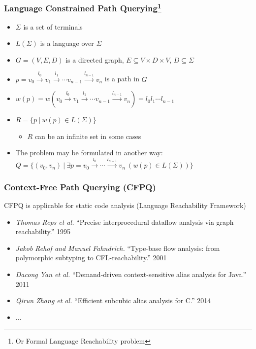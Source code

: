 \documentclass[xcolor=table]{beamer}
\begin{document}
\begin{frame}[fragile]
  \frametitle{Language Constrained Path Querying\footnote{Or Formal Language Reachability problem}}
  \begin{itemize}
  \item $\Sigma$ is a set of terminals 
  \item $L(\Sigma)$ is a language over $\Sigma$
  \pause
  \item $G = (V,E,D)$ is a directed graph, $E \subseteq V\times D \times V$, $D\subseteq \Sigma$
  \pause
  \item $p = v_0 \xrightarrow{l_0} v_1 \xrightarrow{l_1} \cdots v_{n-1}\xrightarrow{l_{n-1}}v_n$ is a path in $G$
  \item $w(p) = w(v_0 \xrightarrow{l_0} v_1 \xrightarrow{l_1} \cdots v_{n-1}\xrightarrow{l_{n-1}}v_n) = l_0 l_1 \cdots l_{n-1}$
  \pause
  \item $R =\{ p \ | \ w(p) \in L(\Sigma)\}$
  \begin{itemize}
    \item $R$ can be an infinite set in some cases
  \end{itemize}
  \pause
  \item The problem may be formulated in another way: $Q =\{ (v_0,v_n) \ | \ \exists p = v_0 \xrightarrow{l_0} \cdots \xrightarrow{l_{n-1}}v_n \ (w(p) \in 
  L(\Sigma))\}$
  \end{itemize}
\end{frame}


\begin{frame} \frametitle{Context-Free Path Querying (CFPQ)}
  CFPQ is applicable for static code analysis (Language Reachability Framework)
    \begin{itemize}
        \item \emph{Thomas Reps et al.} ``Precise interprocedural dataflow analysis via graph reachability.'' 1995 
        \item \emph{Jakob Rehof and Manuel Fahndrich.} ``Type-base flow analysis: from polymorphic subtyping to CFL-reachability.'' 2001
        \item \emph{Dacong Yan et al.} ``Demand-driven context-sensitive alias analysis for Java.'' 2011
        \item \emph{Qirun Zhang et al.}  ``Efficient subcubic alias analysis for C.'' 2014
        \item ...
    \end{itemize}
\end{frame}
\end{document}
